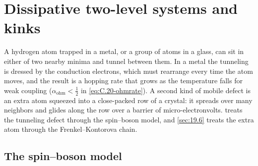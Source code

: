 \section{Dissipative two-level systems and kinks}\label{app:C.20}

A hydrogen atom trapped in a metal, or a group of atoms in a glass, can sit in either of two nearby minima and tunnel between them. In a metal the tunneling is dressed by the conduction electrons, which must rearrange every time the atom moves, and the result is a hopping rate that grows as the temperature falls for weak coupling ($\alpha_{\mathrm{ohm}} < \tfrac12$ in \cref{eq:C.20-ohmrate}). A second kind of mobile defect is an extra atom squeezed into a close-packed row of a crystal: it spreads over many neighbors and glides along the row over a barrier of micro-electronvolts.  treats the tunneling defect through the spin--boson model, and \cref{sec:19.6} treats the extra atom through the Frenkel--Kontorova chain.

\subsection{The spin--boson model}

